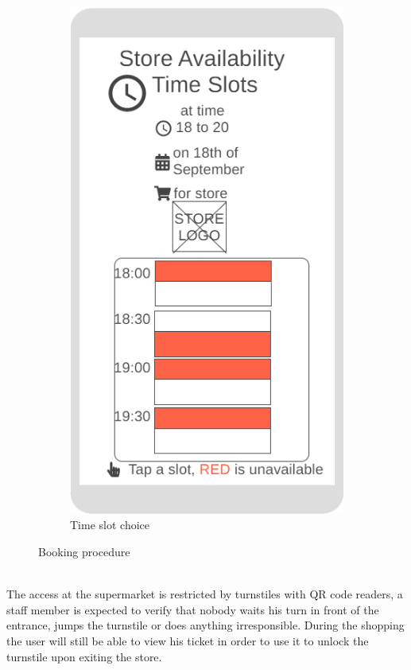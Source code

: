 \begin{figure}[h!]
\begin{subfigure}[b]{0.3\textwidth}
		\includegraphics[width=\linewidth]{../Diagrams/WireframesCLup/TimeSlots.png}
		\caption{Time slot choice}
		\label{fig:WfTimeSlots}
	\end{subfigure}
	\caption{Booking procedure}
	\label{fig:WireframesBooking}
\end{figure}
\\The access at the supermarket is restricted by turnstiles with QR code readers, a staff member is expected to verify that nobody waits his turn in front of the entrance, jumps the turnstile or does anything irresponsible. During the shopping the user will still be able to view his ticket in order to use it to unlock the turnstile upon exiting the store.
